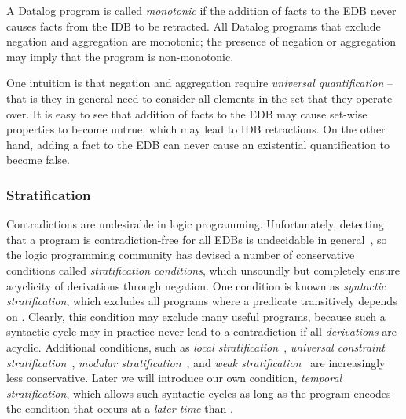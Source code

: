 A Datalog program is called {\em monotonic} if the addition of
facts to the EDB never causes facts from the IDB to be retracted.  All Datalog
programs that exclude negation and aggregation are monotonic; the presence of
negation or aggregation may imply that the program is non-monotonic.

One intuition is that negation and aggregation require {\em universal
quantification} -- that is they in general need to consider all elements in the
set that they operate over.  It is easy to see that addition of facts to the
EDB may cause set-wise properties to become untrue, which may lead to IDB
retractions.  On the other hand, adding a fact to the EDB can never cause an
existential quantification to become false.

\subsubsection{Stratification}

Contradictions are undesirable in logic programming. 
Unfortunately, detecting that a program is contradiction-free for all EDBs is
undecidable in general~\cite{papa-yanna}, so the logic programming community
has devised a number of conservative conditions called {\em stratification
conditions}, which unsoundly but completely ensure acyclicity of derivations
through negation.  One condition is known as {\em syntactic stratification},
which excludes all programs where a predicate  transitively depends
on .  Clearly, this condition may exclude many useful
programs, because such a syntactic cycle may in practice never lead to a
contradiction if all {\em derivations} are acyclic.  Additional conditions,
such as {\em local stratification}~\cite{local-strat}, {\em universal
constraint stratification}~\cite{ross-syntactic}, {\em modular
stratification}~\cite{modular}, and {\em weak stratification}~\cite{weak-strat}
are increasingly less conservative.  Later we will introduce our own condition,
{\em temporal stratification}, which allows such syntactic cycles as long as
the program encodes the condition that  occurs at a {\em later time}
than .

